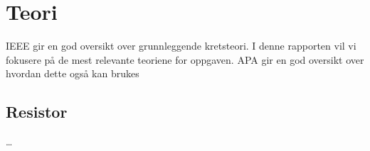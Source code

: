 \section{Teori}
IEEE \parencite{ieeeGuide} gir en god oversikt over grunnleggende kretsteori. 
I denne rapporten vil vi fokusere på de mest relevante teoriene for oppgaven. 
APA\cite{apaGuide} gir en god oversikt over hvordan dette også kan brukes

\subsection{Resistor}
\dots

